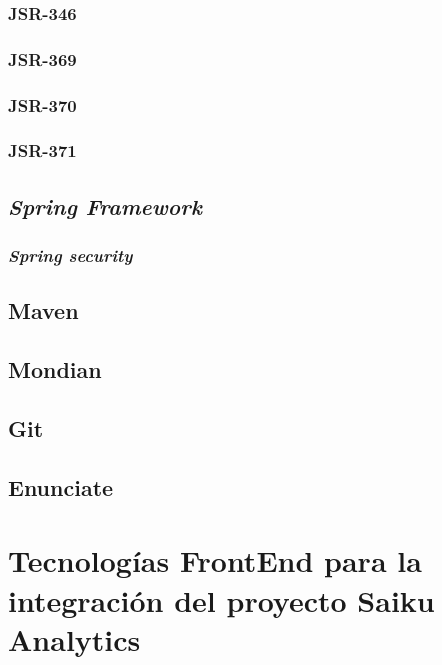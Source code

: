 		\subsubsection{JSR-346}
				\lipsum[1-2]
		\subsubsection{JSR-369}
				\lipsum[1-2]
		\subsubsection{JSR-370}
		\lipsum[1-2]
		\subsubsection{JSR-371}
		\lipsum[1-2]
	\subsection{\textit{Spring Framework}}
			\lipsum[1-2]
		\subsubsection{\textit{Spring security}}
				\lipsum[1-2]
	\subsection{Maven}
			\lipsum[1-2]
	\subsection{Mondian}
			\lipsum[1-2]
	\subsection{Git}
			\lipsum[1-2]
	\subsection{Enunciate}
			\lipsum[1-2]
\section{Tecnolog\'{i}as FrontEnd para la integraci\'{o}n
		 del proyecto Saiku Analytics}
		\lipsum[1-2]
